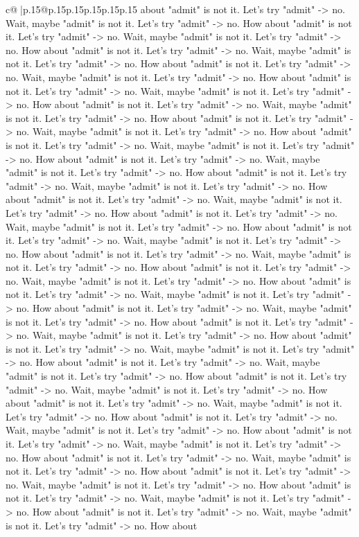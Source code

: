 \documentclass{article}
\begin{document}
{\begin{supertabular}{c@{$\;$}|p{.15\linewidth}@{}p{.15\linewidth}p{.15\linewidth}p{.15\linewidth}p{.15\linewidth}p{.15\linewidth}}
{{{about "admit" is not it. Let's try "admit" {-}> no. Wait, maybe "admit" is not it. Let's try "admit" {-}> no. How about "admit" is not it. Let's try "admit" {-}> no. Wait, maybe "admit" is not it. Let's try "admit" {-}> no. How about "admit" is not it. Let's try "admit" {-}> no. Wait, maybe "admit" is not it. Let's try "admit" {-}> no. How about "admit" is not it. Let's try "admit" {-}> no. Wait, maybe "admit" is not it. Let's try "admit" {-}> no. How about "admit" is not it. Let's try "admit" {-}> no. Wait, maybe "admit" is not it. Let's try "admit" {-}> no. How about "admit" is not it. Let's try "admit" {-}> no. Wait, maybe "admit" is not it. Let's try "admit" {-}> no. How about "admit" is not it. Let's try "admit" {-}> no. Wait, maybe "admit" is not it. Let's try "admit" {-}> no. How about "admit" is not it. Let's try "admit" {-}> no. Wait, maybe "admit" is not it. Let's try "admit" {-}> no. How about "admit" is not it. Let's try "admit" {-}> no. Wait, maybe "admit" is not it. Let's try "admit" {-}> no. How about "admit" is not it. Let's try "admit" {-}> no. Wait, maybe "admit" is not it. Let's try "admit" {-}> no. How about "admit" is not it. Let's try "admit" {-}> no. Wait, maybe "admit" is not it. Let's try "admit" {-}> no. How about "admit" is not it. Let's try "admit" {-}> no. Wait, maybe "admit" is not it. Let's try "admit" {-}> no. How about "admit" is not it. Let's try "admit" {-}> no. Wait, maybe "admit" is not it. Let's try "admit" {-}> no. How about "admit" is not it. Let's try "admit" {-}> no. Wait, maybe "admit" is not it. Let's try "admit" {-}> no. How about "admit" is not it. Let's try "admit" {-}> no. Wait, maybe "admit" is not it. Let's try "admit" {-}> no. How about "admit" is not it. Let's try "admit" {-}> no. Wait, maybe "admit" is not it. Let's try "admit" {-}> no. How about "admit" is not it. Let's try "admit" {-}> no. Wait, maybe "admit" is not it. Let's try "admit" {-}> no. How about "admit" is not it. Let's try "admit" {-}> no. Wait, maybe "admit" is not it. Let's try "admit" {-}> no. How about "admit" is not it. Let's try "admit" {-}> no. Wait, maybe "admit" is not it. Let's try "admit" {-}> no. How about "admit" is not it. Let's try "admit" {-}> no. Wait, maybe "admit" is not it. Let's try "admit" {-}> no. How about "admit" is not it. Let's try "admit" {-}> no. Wait, maybe "admit" is not it. Let's try "admit" {-}> no. How about "admit" is not it. Let's try "admit" {-}> no. Wait, maybe "admit" is not it. Let's try "admit" {-}> no. How about "admit" is not it. Let's try "admit" {-}> no. Wait, maybe "admit" is not it. Let's try "admit" {-}> no. How about "admit" is not it. Let's try "admit" {-}> no. Wait, maybe "admit" is not it. Let's try "admit" {-}> no. How about "admit" is not it. Let's try "admit" {-}> no. Wait, maybe "admit" is not it. Let's try "admit" {-}> no. How about "admit" is not it. Let's try "admit" {-}> no. Wait, maybe "admit" is not it. Let's try "admit" {-}> no. How about "admit" is not it. Let's try "admit" {-}> no. Wait, maybe "admit" is not it. Let's try "admit" {-}> no. How about "admit" is not it. Let's try "admit" {-}> no. Wait, maybe "admit" is not it. Let's try "admit" {-}> no. How about }}}
\end{supertabular}}
\end{document}
